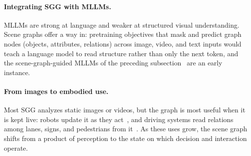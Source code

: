 \paragraph{Integrating SGG with MLLMs.}
MLLMs are strong at language and weaker at structured visual understanding. Scene graphs offer a way in: pretraining objectives that mask and predict graph nodes (objects, attributes, relations) across image, video, and text inputs would teach a language model to read structure rather than only the next token, and the scene-graph-guided MLLMs of the preceding subsection~\cite{xu2025llava} are an early instance.

\paragraph{From images to embodied use.}
Most SGG analyzes static images or videos, but the graph is most useful when it is kept live: robots update it as they act~\cite{nguyen2025generating,werby2024hierarchical,garg2024robohop}, and driving systems read relations among lanes, signs, and pedestrians from it~\cite{zhou2022toward,liu2023learning,malawade2022roadscene2vec}. As these uses grow, the scene graph shifts from a product of perception to the state on which decision and interaction operate.

